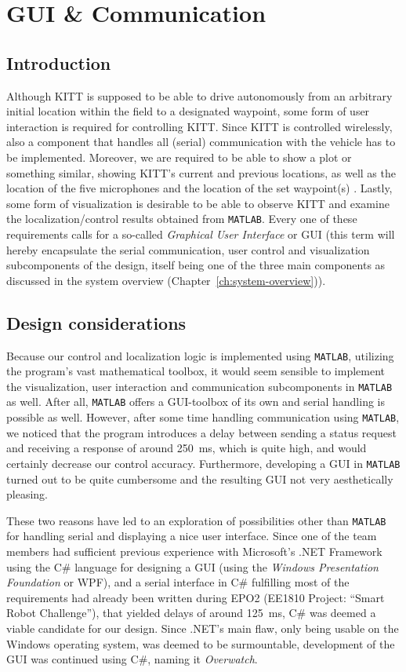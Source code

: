 \documentclass[11pt,titlepage]{report}
\begin{document}
\chapter{GUI \& Communication}
\label{ch:gui-communication}
\section{Introduction}
Although KITT is supposed to be able to drive autonomously from an arbitrary initial location within the field to a designated waypoint, some form of user interaction is required for controlling KITT. Since KITT is controlled wirelessly, also a component that handles all (serial) communication with the vehicle has to be implemented. Moreover, we are required to be able to show a plot or something similar, showing KITT's current and previous locations, as well as the location of the five microphones and the location of the set waypoint(s) \cite[114]{epo4-manual}. Lastly, some form of visualization is desirable to be able to observe KITT and examine the localization/control results obtained from \texttt{MATLAB}. Every one of these requirements calls for a so-called \emph{Graphical User Interface} or GUI (this term will hereby encapsulate the serial communication, user control and visualization subcomponents of the design, itself being one of the three main components as discussed in the system overview (Chapter~\ref{ch:system-overview})).

\section{Design considerations}
Because our control and localization logic is implemented using \texttt{MATLAB}, utilizing the program's vast mathematical toolbox, it would seem sensible to implement the visualization, user interaction and communication subcomponents in \texttt{MATLAB} as well. After all, \texttt{MATLAB} offers a GUI-toolbox of its own and serial handling is possible as well. However, after some time handling communication using \texttt{MATLAB}, we noticed that the program introduces a delay between sending a status request and receiving a response of around \SI{250}{ms}, which is quite high, and would certainly decrease our control accuracy. Furthermore, developing a GUI in \texttt{MATLAB} turned out to be quite cumbersome and the resulting GUI not very aesthetically pleasing.

These two reasons have led to an exploration of possibilities other than \texttt{MATLAB} for handling serial and displaying a nice user interface. Since one of the team members had sufficient previous experience with Microsoft's .NET Framework using the C\# language for designing a GUI (using the \emph{Windows Presentation Foundation} or WPF), and a serial interface in C\# fulfilling most of the requirements had already been written during EPO2 (EE1810 Project: ``Smart Robot Challenge''), that yielded delays of around \SI{125}{ms}, C\# was deemed a viable candidate for our design. Since .NET's main flaw, only being usable on the Windows operating system, was deemed to be surmountable, development of the GUI was continued using C\#, naming it \emph{Overwatch}.
\end{document}
